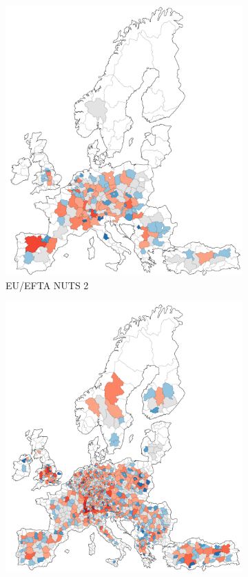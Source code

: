 \begin{figure}[tbp]
	\centering
     
      \begin{subfigure}[b]{0.48\textwidth}
         \centering
         \includegraphics[width=1\textwidth]{./appendices/figures/eu2_lowres.pdf}
         \caption{EU/EFTA NUTS 2}
         \label{appfig:mapa}
     \end{subfigure}
     \hfill
      \begin{subfigure}[b]{0.48\textwidth}
         \centering
         \includegraphics[width=1\textwidth]{./appendices/figures/eu3_lowres.pdf}

\end{subfigure}
\end{figure}
